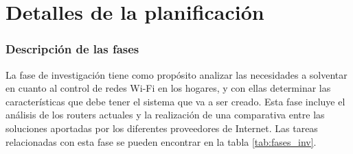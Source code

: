 \documentclass[12pt, twoside]{article}
\begin{document}
        \begin{table}[h!]             
        \centering                  
        \caption{Pruebas de encriptación}
        \label{tab:cripto_tests}
    \end{table}

    \section{Detalles de la planificación}
    \subsubsection{Descripción de las fases}
        La fase de investigación tiene como propósito analizar las necesidades a solventar en cuanto al control de redes Wi-Fi en los hogares, y con ellas determinar las características que debe tener el sistema que va a ser creado. Esta fase incluye el análisis de los routers actuales y la realización de una comparativa entre las soluciones aportadas por los diferentes proveedores de Internet. Las tareas relacionadas con esta fase se pueden encontrar en la tabla \ref{tab:fases_inv}.
\end{document}

